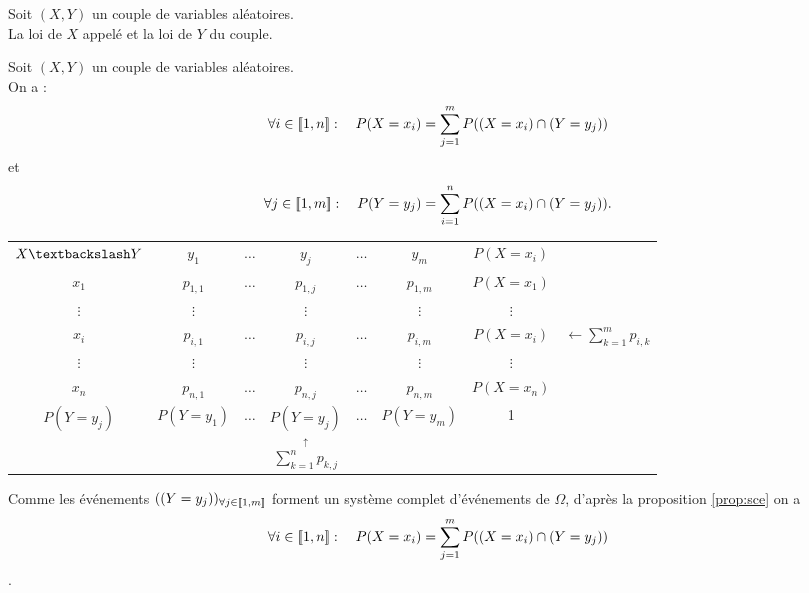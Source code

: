 \documentclass{book}
\begin{document}
\begin{Definition}
Soit $(X,Y)$ un couple de variables aléatoires.\\
La loi de $X$ appelé  et la loi de $Y$  du couple.
\end{Definition}
\begin{Proposition}[Relations]
Soit $(X,Y)$ un couple de variables aléatoires.\\
 On a :
$$\forall i\in  \mathopen\lbrack\!\lbrack1,n \mathclose\rbrack\!\rbrack: \quad P(X=x_i)=\sum_{j=1}^{m }P((X=x_i)\cap (Y=y_j))$$
et 
$$\forall j\in  \mathopen\lbrack\!\lbrack1,m \mathclose\rbrack\!\rbrack: \quad P(Y=y_j)=\sum_{i=1}^{n }P((X=x_i)\cap (Y=y_j)).$$ 
\begin{center}
\begin{tabular}{|c|ccccc|c|c}
\cline{1-7}
$X\textbackslash Y$ & $y_1$ &$\dots$ & $y_j$&$\dots$&$y_m$&$P(X=x_i)$\\\cline{1-7}
$x_1$ & $p_{1,1}$ &$\dots$ & $p_{1,j}$&$\dots$&$p_{1,m}$&$P(X=x_1)$\\
$\vdots$ & $\vdots$ &  & $\vdots$& &$\vdots$&$\vdots$\\
$x_i$ & $p_{i,1}$ &$\dots$ & $p_{i,j}$&$\dots$&$p_{i,m}$&$P(X=x_i)$&$\leftarrow\sum_{k=1}^m p_{i,k}$ \\
$\vdots$ & $\vdots$ &  & $\vdots$& &$\vdots$&$\vdots$\\
$x_n$ & $p_{n,1}$ &$\dots$ & $p_{n,j}$&$\dots$&$p_{n,m}$&$P(X=x_n)$\\\cline{1-7}
$P(Y=y_j)$& $P(Y=y_1)$&$\dots$&$P(Y=y_j)$&$\dots$&$P(Y=y_m)$&1\\\cline{1-7}
      & & &$\overset{\uparrow}{\sum_{k=1}^n p_{k,j}}$ & & &\\
\end{tabular}
\end{center} 
\end{Proposition}
\begin{Demonstration}
Comme les événements $( (Y=y_j))_{\forall j\in\mathopen\lbrack\!\lbrack1,m \mathclose\rbrack\!\rbrack}$ forment un système complet d'événements de $\Omega$, d'après la proposition \ref{prop:sce} on a 
$$\forall i\in  \mathopen\lbrack\!\lbrack1,n \mathclose\rbrack\!\rbrack: \quad P(X=x_i)=\sum_{j=1}^{m }P((X=x_i)\cap (Y=y_j))$$ .
\end{Demonstration}
\end{document}
